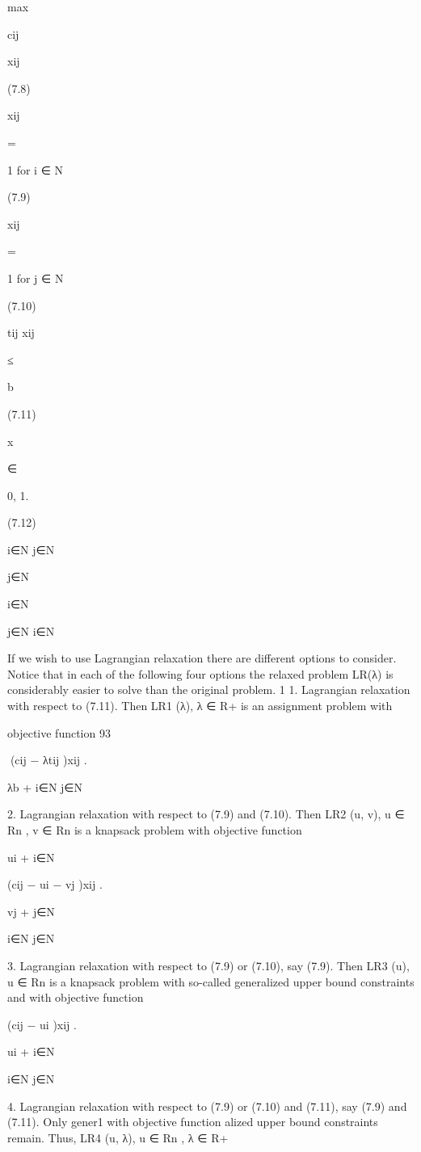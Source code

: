 max

cij

xij

(7.8)

xij

=

1 for i ∈ N

(7.9)

xij

=

1 for j ∈ N

(7.10)

tij xij

≤

b

(7.11)

x

∈

{0, 1}.

(7.12)

i∈N j∈N

j∈N

i∈N

j∈N i∈N

If we wish to use Lagrangian relaxation there are different options to consider. Notice that in each of
the following four options the relaxed problem LR(λ) is considerably easier to solve than the original
problem.
1
1. Lagrangian relaxation with respect to (7.11). Then LR1 (λ), λ ∈ R+
is an assignment problem with

objective function
93

(cij − λtij )xij .

λb +
i∈N j∈N

2. Lagrangian relaxation with respect to (7.9) and (7.10). Then LR2 (u, v), u ∈ Rn , v ∈ Rn is a
knapsack problem with objective function

ui +
i∈N

(cij − ui − vj )xij .

vj +
j∈N

i∈N j∈N

3. Lagrangian relaxation with respect to (7.9) or (7.10), say (7.9). Then LR3 (u), u ∈ Rn is a knapsack
problem with so-called generalized upper bound constraints and with objective function

(cij − ui )xij .

ui +
i∈N

i∈N j∈N

4. Lagrangian relaxation with respect to (7.9) or (7.10) and (7.11), say (7.9) and (7.11). Only gener1
with objective function
alized upper bound constraints remain. Thus, LR4 (u, λ), u ∈ Rn , λ ∈ R+

